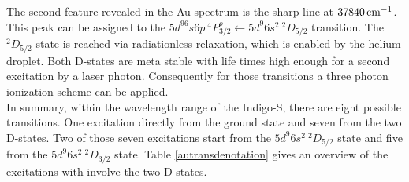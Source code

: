 \documentclass[parskip,12pt,headsepline,a4paper] {scrbook}
\begin{document}
The second feature revealed in the Au spectrum is the sharp line at $\unit[37840]{cm^{-1}}$. This peak can be assigned to the $5d^96s6p \ ^4P^o_{3/2} \leftarrow 5d^{9} 6s^{2} \ ^2D_{5/2}$ transition. The $^2D_{5/2}$ state is reached via radiationless relaxation, which is enabled by the helium droplet. Both D-states are meta stable with life times high enough for a second excitation by a laser photon. Consequently for those transitions a three photon ionization scheme can be applied. \\

In summary, within the wavelength range of the Indigo-S, there are eight possible transitions. One excitation directly from the ground state and seven from the two D-states. Two of those seven excitations start from the $5d^{9} 6s^{2} \ ^2D_{5/2}$ state and five from the $5d^{9} 6s^{2} \ ^2D_{3/2}$ state. Table \ref{autransdenotation} gives an overview of the excitations with involve the two D-states.
\end{document}
